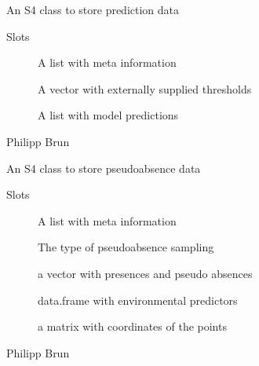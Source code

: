 \documentclass[a4paper]{book}
\begin{document}
%
\begin{Description}\relax
An S4 class to store prediction data
\end{Description}
%
\begin{Section}{Slots}

\begin{description}

\item[] A list with meta information

\item[] A vector with externally supplied thresholds

\item[] A list with model predictions

\end{description}
\end{Section}
%
\begin{Author}\relax
Philipp Brun
\end{Author}
%
\begin{Description}\relax
An S4 class to store pseudoabsence data
\end{Description}
%
\begin{Section}{Slots}

\begin{description}

\item[] A list with meta information

\item[] The type of pseudoabsence sampling

\item[] a vector with presences and pseudo absences

\item[] data.frame with environmental predictors

\item[] a matrix with coordinates of the points

\end{description}
\end{Section}
%
\begin{Author}\relax
Philipp Brun
\end{Author}
\end{document}
